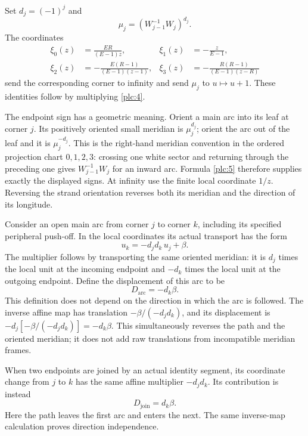 Set \(d_j=(-1)^j\) and \begin{equation}
\mu_j=(W_{j-1}^{-1}W_j)^{d_j}.
\label{plc:5}
\end{equation} The coordinates \begin{equation}
\begin{aligned}
\xi_0(z)&=\frac{ER}{(E-1)z},
&\xi_1(z)&=-\frac{z}{E-1},\\
\xi_2(z)&=-\frac{E(R-1)}{(E-1)(z-1)},
&\xi_3(z)&=-\frac{R(R-1)}{(E-1)(z-R)}
\end{aligned}
\label{plc:6}
\end{equation} send the corresponding corner to infinity and send \(\mu_j\) to
\(u\mapsto u+1\). These identities follow by multiplying \eqref{plc:4}.

The endpoint sign has a geometric meaning. Orient a main arc into its
leaf at corner \(j\). Its positively oriented small meridian is
\(\mu_j^{d_j}\); orient the arc out of the leaf and it is
\(\mu_j^{-d_j}\). This is the right-hand meridian convention in the
ordered projection chart \(0,1,2,3\): crossing one white sector and
returning through the preceding one gives \(W_{j-1}^{-1}W_j\) for an
inward arc. Formula \eqref{plc:5} therefore supplies exactly the displayed signs.
At infinity use the finite local coordinate \(1/z\). Reversing the
strand orientation reverses both its meridian and the direction of its
longitude.

Consider an open main arc from corner \(j\) to corner \(k\), including
its specified peripheral push-off. In the local coordinates its actual
transport has the form \begin{equation}
u_k=-d_jd_k\,u_j+\beta.
\label{plc:7}
\end{equation} The multiplier follows by transporting the same oriented meridian: it
is \(d_j\) times the local unit at the incoming endpoint and \(-d_k\)
times the local unit at the outgoing endpoint. Define the displacement
of this arc to be \begin{equation}
D_{\mathrm{arc}}=-d_k\beta.
\label{plc:8}
\end{equation} This definition does not depend on the direction in which the arc is
followed. The inverse affine map has translation \(-\beta/(-d_jd_k)\),
and its displacement is \(-d_j[-\beta/(-d_jd_k)]=-d_k\beta\). This
simultaneously reverses the path and the oriented meridian; it does not
add raw translations from incompatible meridian frames.

When two endpoints are joined by an actual identity segment, its
coordinate change from \(j\) to \(k\) has the same affine multiplier
\(-d_jd_k\). Its contribution is instead \begin{equation}
D_{\mathrm{join}}=d_k\beta.
\label{plc:9}
\end{equation} Here the path leaves the first arc and enters the next. The same
inverse-map calculation proves direction independence.

